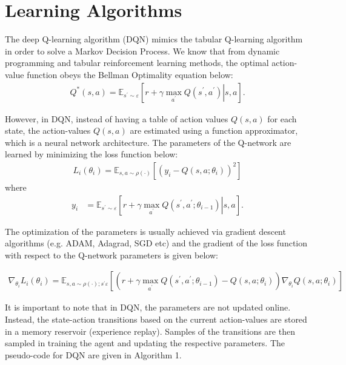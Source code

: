 \documentclass[12pt,twoside]{article}
\begin{document}




\section{Learning Algorithms}
The deep Q-learning algorithm (DQN) mimics the tabular Q-learning algorithm in order to solve a Markov Decision Process. We know that from dynamic programming and tabular reinforcement learning methods, the optimal action-value function obeys the Bellman Optimality equation below:
\begin{align*}
Q^*(s,a) = \mathbb{E}_{s^\prime \sim \varepsilon}\left[\left. r + \gamma \max_{a^\prime} Q(s^\prime, a^\prime)\right\vert s,a \right].
\end{align*}

However, in DQN, instead of having a table of action values $Q(s,a)$ for each state, the action-values $Q(s,a)$ are estimated using a function approximator, which is a neural network architecture. The parameters of the Q-network are learned by minimizing the loss function below:
\begin{align*}
	L_i(\theta_i) = \mathbb{E}_{s,a \sim \rho(\cdot)}\left[(y_i - Q(s,a;\theta_i))^2\right]
\end{align*}
where
\begin{align*}
	y_i & = \mathbb{E}_{s^\prime \sim \varepsilon}\left[\left.r +\gamma \max_{a^\prime}Q(s^\prime, a^\prime; \theta_{i-1})\right\vert s,a\right].
\end{align*}

The optimization of the parameters is usually achieved via gradient descent algorithms (e.g. ADAM, Adagrad, SGD etc) and the gradient of the loss function with respect to the Q-network parameters is given below:

\begin{align*}
	\nabla_{\theta_i} L_i(\theta_i) = \mathbb{E}_{s,a\sim\rho(\cdot); s^\prime \varepsilon}\left[\left(r + \gamma \max_{a^\prime} Q(s^\prime, a^\prime; \theta_{i-1}) - Q(s,a;\theta_i)\right)\nabla_{\theta_i} Q(s,a;\theta_i)\right]
\end{align*}	

It is important to note that in DQN, the parameters are not updated online. Instead, the state-action transitions based on the current action-values are stored in a memory reservoir (experience replay). Samples of the transitions are then sampled in training the agent and updating the respective parameters. The pseudo-code for DQN are given in Algorithm 1.\\
\end{document}
